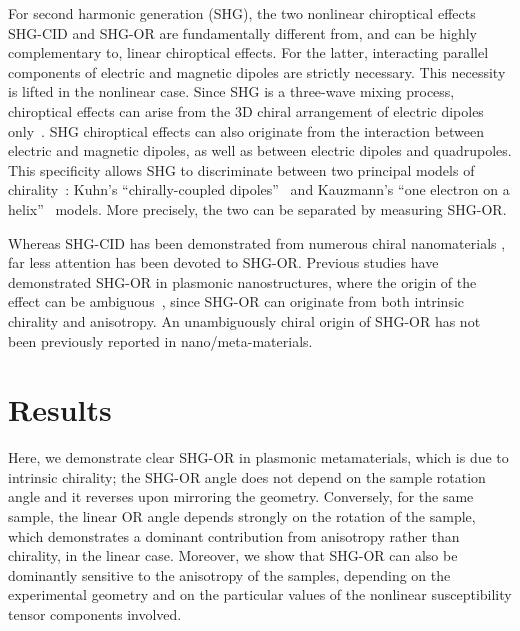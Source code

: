 For second harmonic generation (SHG), the two nonlinear chiroptical effects SHG-CID and SHG-OR are fundamentally different from, and can be highly complementary to, linear chiroptical effects. For the latter, interacting parallel components of electric and magnetic dipoles are strictly necessary. This necessity is lifted in the nonlinear case. Since SHG is a three-wave mixing process, chiroptical effects can arise from the 3D chiral arrangement of electric dipoles only~\cite{verbiest2009second}. 
SHG chiroptical effects can also originate from the interaction between electric and magnetic dipoles, as well as between electric dipoles and quadrupoles. This specificity allows SHG to discriminate between two principal models of chirality~\cite{Fischer2005a}: Kuhn's ``chirally-coupled dipoles''~\cite{Kuhn1930} and Kauzmann's ``one electron on a helix''~\cite{Kauzmann1957a} models. More precisely, the two can be separated by measuring SHG-OR. 

Whereas SHG-CID has been demonstrated from numerous chiral nanomaterials \cite{Hooper2017, Mamonov2017, Chen2016, Kolkowski2015, Belardini2014}, far less attention has been devoted to SHG-OR. Previous studies have demonstrated SHG-OR in plasmonic nanostructures, where the origin of the effect can be ambiguous~\cite{Romain2017, Ren2012a, Mamonov2012}, since SHG-OR can originate from both intrinsic chirality and anisotropy. An unambiguously chiral origin of SHG-OR has not been previously reported in nano/meta-materials. 

\section{Results}\label{sec:results:OAinPlanarNanohelices:results}
Here, we demonstrate clear SHG-OR in plasmonic metamaterials, which is due to intrinsic chirality; the SHG-OR angle does not depend on the sample rotation angle and it reverses upon mirroring the geometry. Conversely, for the same sample, the linear OR angle depends strongly on the rotation of the sample, which demonstrates a dominant contribution from anisotropy rather than chirality, in the linear case. Moreover, we show that SHG-OR can also be dominantly sensitive to the anisotropy of the samples, depending on the experimental geometry and on the particular values of the nonlinear susceptibility tensor components involved. 

